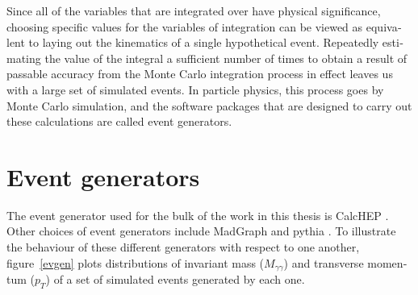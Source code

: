 \begin{english}
Since all of the variables that are integrated over have physical significance, choosing specific values for the variables of integration can be viewed as equivalent to laying out the kinematics of a single hypothetical event. Repeatedly estimating the value of the integral a sufficient number of times to obtain a result of passable accuracy from the Monte Carlo integration process in effect leaves us with a large set of simulated events. In particle physics, this process goes by Monte Carlo simulation, and the software packages that are designed to carry out these calculations are called event generators.

\section{Event generators}

The event generator used for the bulk of the work in this thesis is CalcHEP \cite{calchep}. Other choices of event generators include MadGraph \cite{madgraph5} and pythia \cite{pythia}. To illustrate the behaviour of these different generators with respect to one another, figure~\ref{evgen} plots distributions of invariant mass ($M_{\gamma\gamma}$) and transverse momentum ($p_T$) of a set of simulated events generated by each one.

\begin{figure}[hbtp]
\begin{minipage}[b]{.69\textwidth}
\begin{infilsf} \tiny
\hspace{-1ex}\makebox[0pt][l]{}
\end{infilsf}
\end{minipage}
\begin{minipage}[b]{.3\textwidth}

\phantom{p}
\end{minipage}
\begin{minipage}[b]{.69\textwidth}
\begin{infilsf} \tiny
\hspace{-1ex}\makebox[0pt][l]{}
\end{infilsf}
\end{minipage}
\begin{minipage}[b]{.3\textwidth}


\end{minipage}
\end{figure}
\end{english}
